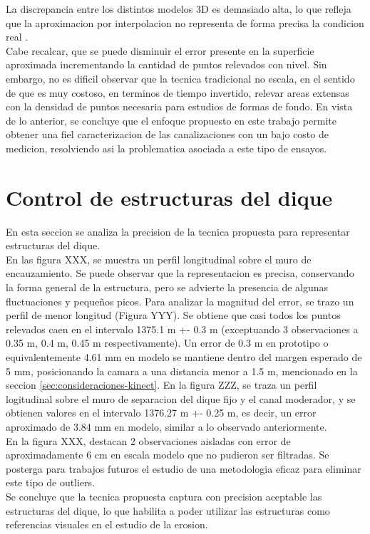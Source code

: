 La discrepancia entre los distintos modelos 3D es demasiado alta, lo que refleja que la aproximacion por interpolacion no representa de forma precisa la condicion real . \\
Cabe recalcar, que se puede disminuir el error presente en la superficie aproximada incrementando la cantidad de puntos relevados con nivel. Sin embargo, no es dificil observar que la tecnica tradicional no escala, en el sentido de que es muy costoso, en terminos de tiempo invertido, relevar areas extensas con la densidad de puntos necesaria para estudios de formas de fondo. En vista de lo anterior, se concluye que el enfoque propuesto en este trabajo permite obtener una fiel caracterizacion de las canalizaciones con un bajo costo de medicion, resolviendo asi la problematica asociada a este tipo de ensayos. \\

\section{Control de estructuras del dique}

En esta seccion se analiza la precision de la tecnica propuesta para representar estructuras del dique. \\
En las figura XXX, se muestra un perfil longitudinal sobre el muro de encauzamiento. Se puede observar que la representacion es precisa, conservando la forma general de la estructura, pero se advierte la presencia de algunas fluctuaciones y pequeños picos. Para analizar la magnitud del error, se trazo un perfil de menor longitud (Figura YYY). Se obtiene que casi todos los puntos relevados caen en el intervalo 1375.1 m +- 0.3 m (exceptuando 3 observaciones a 0.35 m, 0.4 m, 0.45 m respectivamente). Un error de 0.3 m en prototipo o equivalentemente 4.61 mm en modelo se mantiene dentro del margen esperado de 5 mm, posicionando la camara a una distancia menor a 1.5 m, mencionado en la seccion \ref{sec:consideraciones-kinect}. En la figura ZZZ, se traza un perfil logitudinal sobre el muro de separacion del dique fijo y el canal moderador, y se obtienen valores en el intervalo 1376.27 m +- 0.25 m, es decir, un error aproximado de 3.84 mm en modelo, similar a lo observado anteriormente. \\
En la figura XXX, destacan 2 observaciones aisladas con error de aproximadamente 6 cm en escala modelo que no pudieron ser filtradas. Se posterga para trabajos futuros el estudio de una metodologia eficaz para eliminar este tipo de outliers. \\
Se concluye que la tecnica propuesta captura con precision aceptable las estructuras del dique, lo que habilita a poder utilizar las estructuras como referencias visuales en el estudio de la erosion.